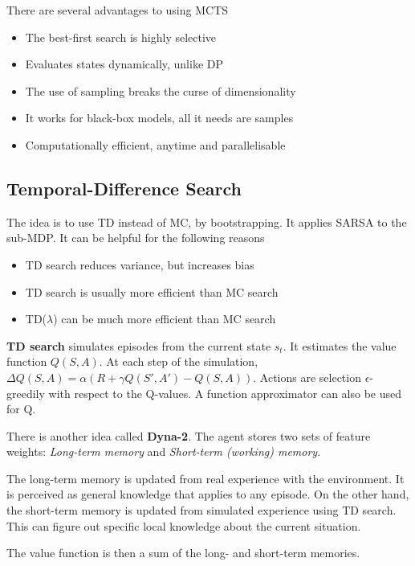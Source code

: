 There are several advantages to using MCTS
\begin{itemize}
	\item The best-first search is highly selective
	\item Evaluates states dynamically, unlike DP
	\item The use of sampling breaks the curse of dimensionality
	\item It works for black-box models, all it needs are samples
	\item Computationally efficient, anytime and parallelisable
\end{itemize}

\subsection{Temporal-Difference Search}

The idea is to use TD instead of MC, by bootstrapping. It applies SARSA to the sub-MDP. It can be helpful for the following reasons
\begin{itemize}
	\item TD search reduces variance, but increases bias
	\item TD search is usually more efficient than MC search
	\item TD($\lambda$) can be much more efficient than MC search
\end{itemize}

\textbf{TD search} simulates episodes from the current state $s_t$. It estimates the value function $Q(S, A)$. At each step of the simulation, $\Delta Q(S, A) = \alpha (R + \gamma Q(S', A') - Q(S, A))$. Actions are selection $\epsilon$-greedily with respect to the Q-values. A function approximator can also be used for Q.

There is another idea called \textbf{Dyna-2}. The agent stores two sets of feature weights: \textit{Long-term memory} and \textit{Short-term (working) memory}. 

The long-term memory is updated from real experience with the environment. It is perceived as general knowledge that applies to any episode. On the other hand, the short-term memory is updated from simulated experience using TD search. This can figure out specific local knowledge about the current situation.

The value function is then a sum of the long- and short-term memories.

